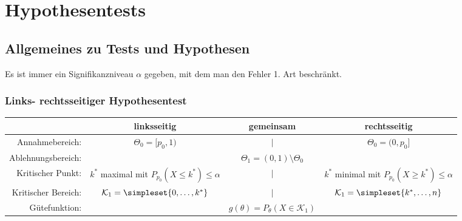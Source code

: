 \chapter{Hypothesentests}
\section{Allgemeines zu Tests und Hypothesen}
Es ist immer ein Signifikanzniveau $\alpha$ gegeben, mit dem man den Fehler 1. Art beschränkt.

\subsection{Links- rechtsseitiger Hypothesentest}
\begin{center}
	\begin{tabular}{r|ccc}
		&linksseitig&gemeinsam&rechtsseitig\\\hline
		Annahmebereich:&$\Theta_0=[p_0,1)$&$\Big|$&$\Theta_0=(0,p_0]$\\
		Ablehnungsbereich:&&$\Theta_1=(0,1)\setminus\Theta_0$&\\
		Kritischer Punkt:&\makecell{$k^\ast$ maximal mit\\ $P_{p_0}(X\leq k^\ast)\leq\alpha$}&$\Bigg|$&\makecell{$k^\ast$ minimal mit\\ $P_{p_0}(X\geq k^\ast)\leq\alpha$}\\
		Kritischer Bereich:&$\mathcal K_1=\simpleset{0,\ldots,k^\ast}$&$\Big|$&$\mathcal K_1=\simpleset{k^\ast,\ldots,n}$\\
		Gütefunktion:&&$g(\theta)=P_\theta(X\in\mathcal K_1)$&
	\end{tabular}
\end{center}


